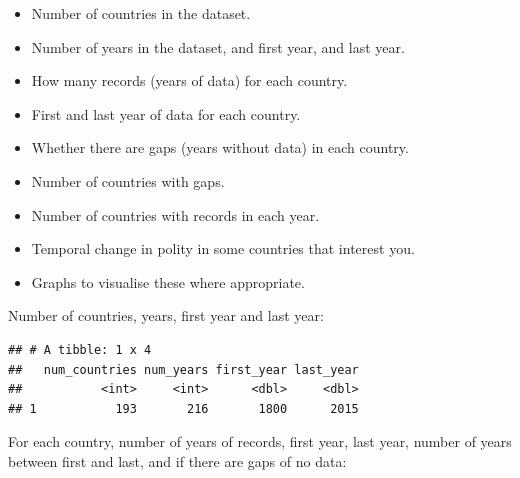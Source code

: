 \documentclass[]{book}
\newenvironment{Shaded}{\begin{snugshade}}{\end{snugshade}}
\newcommand{\DataTypeTok}[1]{\textcolor[rgb]{0.13,0.29,0.53}{#1}}
\newcommand{\DecValTok}[1]{\textcolor[rgb]{0.00,0.00,0.81}{#1}}
\newcommand{\KeywordTok}[1]{\textcolor[rgb]{0.13,0.29,0.53}{\textbf{#1}}}
\newcommand{\NormalTok}[1]{#1}
\newcommand{\OperatorTok}[1]{\textcolor[rgb]{0.81,0.36,0.00}{\textbf{#1}}}
\newcommand{\StringTok}[1]{\textcolor[rgb]{0.31,0.60,0.02}{#1}}
\providecommand{\tightlist}{%
  \setlength{\itemsep}{0pt}\setlength{\parskip}{0pt}}
\begin{document}
\begin{itemize}
\tightlist
\item
  Number of countries in the dataset.
\item
  Number of years in the dataset, and first year, and last year.
\item
  How many records (years of data) for each country.
\item
  First and last year of data for each country.
\item
  Whether there are gaps (years without data) in each country.
\item
  Number of countries with gaps.
\item
  Number of countries with records in each year.
\item
  Temporal change in polity in some countries that interest you.
\item
  Graphs to visualise these where appropriate.
\end{itemize}

Number of countries, years, first year and last year:

\begin{Shaded}
\end{Shaded}

\begin{verbatim}
## # A tibble: 1 x 4
##   num_countries num_years first_year last_year
##           <int>     <int>      <dbl>     <dbl>
## 1           193       216       1800      2015
\end{verbatim}

For each country, number of years of records, first year, last year, number of years between first and last, and if there are gaps of no data:

\begin{Shaded}
\end{Shaded}
\end{document}
